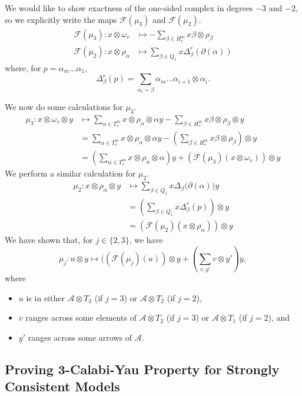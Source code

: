 \documentclass{article}
\theoremstyle{definition}
\newcommand{\A}{{\mathcal A}}
\newcommand{\F}{\mathcal F}
\begin{document}
We would like to show exactness of the one-sided complex in degrees $-3$ and $-2$, so we explicitly write the maps $\F(\mu_3)$ and $\F(\mu_2)$.
\begin{align*}
	\F(\mu_3):x\otimes\omega_v&\mapsto
		-\sum_{\beta\in H_v^m}x\beta\otimes\rho_\beta\\
	\F(\mu_2):x\otimes\rho_\alpha&\mapsto\sum_{\beta\in Q_1}x\Delta_\beta^r(\partial(\alpha))
\end{align*}
where, for $p=\alpha_m\dots\alpha_1$,
\[\Delta_\beta^r(p)=\sum_{\alpha_i=\beta}\alpha_m\dots\alpha_{i+1}\otimes\alpha_i.\]



We now do some calculations for $\mu_3$.
\begin{align*}
	\mu_3:x\otimes\omega_v\otimes y&\mapsto \sum_{\alpha\in T_v^{m}}x\otimes\rho_\alpha\otimes\alpha y-\sum_{\beta\in H_v^{m}}x\beta\otimes\rho_\beta\otimes y\\
	&=\sum_{\alpha\in T_v^{m}}x\otimes\rho_\alpha\otimes\alpha y-\left(\sum_{\beta\in H_v^m}x\beta\otimes\rho_\beta\right)\otimes y\\
	&=\left(\sum_{\alpha\in T_v^{m}}x\otimes\rho_\alpha\otimes\alpha\right)y+(\F(\mu_3)(x\otimes\omega_v))\otimes y
\end{align*}
We perform a similar calculation for $\mu_2$.
\begin{align*}
	\mu_2:x\otimes\rho_\alpha\otimes y&\mapsto\sum_{\beta\in Q_1}x\Delta_\beta\big(\partial(\alpha)\big)y\\
	&=\left(\sum_{\beta\in Q_1}x\Delta_\beta^r(p)\right)\otimes y\\
	&=(\F(\mu_2)(x\otimes\rho_\alpha))\otimes y
\end{align*}
We have shown that, for $j\in\{2,3\}$, we have
\begin{equation}\label{eqn:idd}\mu_j:u\otimes y\mapsto((\F(\mu_j)(u))\otimes y+\left(\sum_{v,y'}v\otimes y'\right)y,\end{equation}
	where 
	\begin{itemize}
		\item $u$ is in either $\A\otimes T_3$ (if $j=3$) or $\A\otimes T_2$ (if $j=2$), 
		\item $v$ ranges across some elements of $\A\otimes T_2$ (if $j=3$) or $\A\otimes T_1$ (if $j=2$), and
		\item $y'$ ranges across some arrows of $\A$.
	\end{itemize}


\subsection{Proving 3-Calabi-Yau Property for Strongly Consistent Models}
\end{document}
